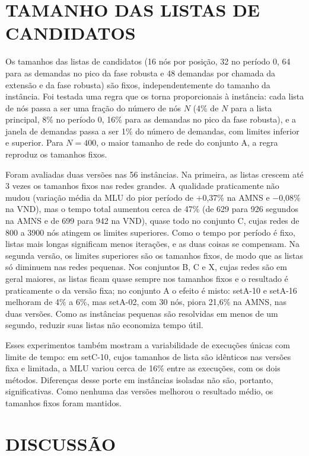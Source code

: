 \section{\uppercase{Tamanho das Listas de Candidatos}}
\label{sec:listas_candidatos}

Os tamanhos das listas de candidatos (16 nós por posição, 32 no período 0, 64 para as demandas no pico da fase robusta e 48 demandas por chamada da extensão e da fase robusta) são fixos, independentemente do tamanho da instância. Foi testada uma regra que os torna proporcionais à instância: cada lista de nós passa a ser uma fração do número de nós $N$ (4\% de $N$ para a lista principal, 8\% no período 0, 16\% para as demandas no pico da fase robusta), e a janela de demandas passa a ser 1\% do número de demandas, com limites inferior e superior. Para $N = 400$, o maior tamanho de rede do conjunto A, a regra reproduz os tamanhos fixos.

Foram avaliadas duas versões nas 56 instâncias. Na primeira, as listas crescem até 3 vezes os tamanhos fixos nas redes grandes. A qualidade praticamente não mudou (variação média da MLU do pior período de $+$0,37\% na AMNS e $-$0,08\% na VND), mas o tempo total aumentou cerca de 47\% (de 629 para 926 segundos na AMNS e de 699 para 942 na VND), quase todo no conjunto C, cujas redes de 800 a 3900 nós atingem os limites superiores. Como o tempo por período é fixo, listas mais longas significam menos iterações, e as duas coisas se compensam. Na segunda versão, os limites superiores são os tamanhos fixos, de modo que as listas só diminuem nas redes pequenas. Nos conjuntos B, C e X, cujas redes são em geral maiores, as listas ficam quase sempre nos tamanhos fixos e o resultado é praticamente o da versão fixa; no conjunto A o efeito é misto: setA-10 e setA-16 melhoram de 4\% a 6\%, mas setA-02, com 30 nós, piora 21,6\% na AMNS, nas duas versões. Como as instâncias pequenas são resolvidas em menos de um segundo, reduzir suas listas não economiza tempo útil.

Esses experimentos também mostram a variabilidade de execuções únicas com limite de tempo: em setC-10, cujos tamanhos de lista são idênticos nas versões fixa e limitada, a MLU variou cerca de 16\% entre as execuções, com os dois métodos. Diferenças desse porte em instâncias isoladas não são, portanto, significativas. Como nenhuma das versões melhorou o resultado médio, os tamanhos fixos foram mantidos.

\section{\uppercase{Discussão}}


